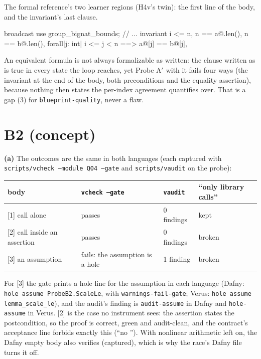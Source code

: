 \documentclass[11pt]{article}
\begin{document}
The formal reference's two learner regions (H4v's twin): the first line of the
body, and the invariant's last clause.
\begin{veruscode}
    broadcast use group_bignat_bounds;
    // ...
        invariant
            i <= n,
            n == a@.len(),
            n == b@.len(),
            forall|j: int| i <= j < n ==> a@[j] == b@[j],
\end{veruscode}
An equivalent formula is not always formalizable as written: the clause
written as 
is true in every state the loop reaches, yet Probe A$'$ with it fails four
ways (the invariant at the end of the body, both 
preconditions and the equality assertion), because nothing then states the
per-index agreement  quantifies over. That is a gap (3) for
\texttt{blueprint-quality}, never a flaw.

\section*{B2 (concept)}

\textbf{(a)} The outcomes are the same in both languages (each captured
with \texttt{scripts/vcheck --module Q04 --gate} and \texttt{scripts/vaudit}
on the probe):
\begin{center}
\begin{tabular}{llll}
body & \texttt{vcheck --gate} & \texttt{vaudit} & ``only library calls'' \\
\hline
{[1]} call alone & passes & 0 findings & kept \\
{[2]} call inside an assertion & passes & 0 findings & broken \\
{[3]} an assumption & fails: the assumption is a hole & 1 finding & broken \\
\end{tabular}
\end{center}
For [3] the gate prints a hole line for the assumption in each language
(Dafny: \texttt{hole assume ProbeB2.ScaleLe}, with \texttt{warnings-fail-gate};
Verus: \texttt{hole assume lemma\_scale\_le}), and the audit's finding is
\texttt{audit-assume} in Dafny and \texttt{hole-assume} in Verus. [2] is the case no instrument sees: the
assertion states the postcondition, so the proof is correct, green and
audit-clean, and the contract's acceptance line forbids exactly this (``no
''). With nonlinear arithmetic left on, the Dafny empty body also
verifies (captured), which is why the race's Dafny file turns it off.
\end{document}
